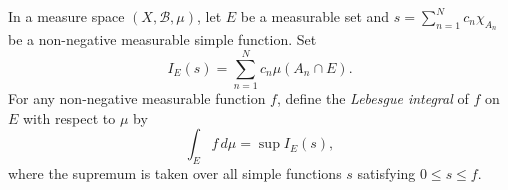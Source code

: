 In a measure space $(X, \mathcal{B}, \mu)$, let $E$ be a measurable set and $s = \sum_{n=1}^{N} c_n \chi_{A_n}$ be a non-negative measurable simple function. Set
$$I_E(s) = \sum_{n=1}^{N} c_n \mu(A_n \cap E).$$
For any non-negative measurable function $f$, define the \textit{Lebesgue integral} of $f$ on $E$ with respect to $\mu$ by
$$\int_E f \, d\mu = \sup I_E(s),$$
where the supremum is taken over all simple functions $s$ satisfying $0 \leq s \leq f$.
